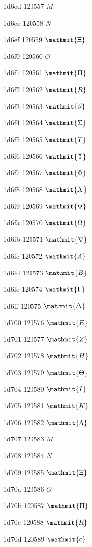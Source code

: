 \documentclass[11pt]{article}
\begin{document}
1d6ed 120557 \ensuremath{M}

1d6ee 120558 \ensuremath{N}

1d6ef 120559 \ensuremath{\mathmit{\Xi}}

1d6f0 120560 \ensuremath{O}

1d6f1 120561 \ensuremath{\mathmit{\Pi}}

1d6f2 120562 \ensuremath{\mathmit{R}}

1d6f3 120563 \ensuremath{\mathmit{\vartheta}}

1d6f4 120564 \ensuremath{\mathmit{\Sigma}}

1d6f5 120565 \ensuremath{\mathmit{T}}

1d6f6 120566 \ensuremath{\mathmit{\Upsilon}}

1d6f7 120567 \ensuremath{\mathmit{\Phi}}

1d6f8 120568 \ensuremath{\mathmit{X}}

1d6f9 120569 \ensuremath{\mathmit{\Psi}}

1d6fa 120570 \ensuremath{\mathmit{\Omega}}

1d6fb 120571 \ensuremath{\mathmit{\nabla}}

1d6fc 120572 \ensuremath{\mathmit{A}}

1d6fd 120573 \ensuremath{\mathmit{B}}

1d6fe 120574 \ensuremath{\mathmit{\Gamma}}

1d6ff 120575 \ensuremath{\mathmit{\Delta}}

1d700 120576 \ensuremath{\mathmit{E}}

1d701 120577 \ensuremath{\mathmit{Z}}

1d702 120578 \ensuremath{\mathmit{H}}

1d703 120579 \ensuremath{\mathmit{\Theta}}

1d704 120580 \ensuremath{\mathmit{I}}

1d705 120581 \ensuremath{\mathmit{K}}

1d706 120582 \ensuremath{\mathmit{\Lambda}}

1d707 120583 \ensuremath{M}

1d708 120584 \ensuremath{N}

1d709 120585 \ensuremath{\mathmit{\Xi}}

1d70a 120586 \ensuremath{O}

1d70b 120587 \ensuremath{\mathmit{\Pi}}

1d70c 120588 \ensuremath{\mathmit{R}}

1d70d 120589 \ensuremath{\mathmit{\varsigma}}
\end{document}
